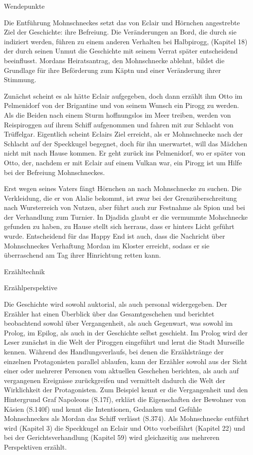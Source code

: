 Wendepunkte

Die Entführung Mohnschneckes setzt das von Eclair und Hörnchen angestrebte Ziel der Geschichte: ihre Befreiung.  Die Veränderungen an Bord, die durch sie indiziert werden, führen zu einem anderen Verhalten bei Halbpirogg, (Kapitel 18) der durch seinen Unmut die Geschichte mit seinem Verrat später entscheidend beeinflusst. Mordans Heiratsantrag, den Mohnschnecke ablehnt, bildet die Grundlage für ihre Beförderung zum Käptn und einer Veränderung ihrer Stimmung. 

Zunächst scheint es als hätte Eclair aufgegeben, doch dann erzählt ihm Otto im Pelmenidorf von der Brigantine und von seinem Wunsch ein Pirogg zu werden. Als die Beiden nach einem Sturm hoffnungslos im Meer treiben, werden von Reispiroggen auf ihrem Schiff aufgenommen und fahren mit zur Schlacht von Trüffelgar. Eigentlich scheint Eclairs Ziel erreicht, als er Mohnschnecke nach der Schlacht auf der Speckkugel begegnet, doch für ihn unerwartet, will das Mädchen nicht mit nach Hause kommen. Er geht zurück ins Pelmenidorf, wo er später von Otto, der, nachdem er mit Eclair auf einem Vulkan war, ein Pirogg ist um Hilfe bei der Befreiung Mohnschneckes.

Erst wegen seines Vaters fängt Hörnchen an nach Mohnschnecke zu suchen. Die Verkleidung, die er von Alalie bekommt, ist zwar bei der Grenzüberschreitung nach Wursterreich von Nutzen, aber führt auch zur Festnahme als Spion und bei der Verhandlung zum Turnier. In Djadida glaubt er die vermummte Mohschnecke gefunden zu haben, zu Hause stellt sich herraus, dass er hinters Licht geführt wurde. 
Entscheidend für das Happy End ist auch, dass die Nachricht über Mohnschneckes Verhaftung Mordan im Kloster erreicht, sodass er sie überraschend am Tag ihrer Hinrichtung retten kann.


Erzähltechnik
	
Erzählperspektive

Die Geschichte wird sowohl auktorial, als auch personal widergegeben. Der Erzähler hat einen Überblick über das Gesamtgeschehen und berichtet  beobachtend sowohl über Vergangenheit, als auch Gegenwart, was sowohl im Prolog, im Epilog, als auch in der Geschichte selbst geschieht. 
Im Prolog wird der Leser zunächst in die Welt der Piroggen eingeführt und lernt die Stadt Murseille kennen. Während des Handlungsverlaufs, bei denen die Erzählstränge der einzelnen Protagonisten parallel ablaufen, kann der Erzähler sowohl aus der Sicht einer oder mehrerer Personen vom aktuellen Geschehen berichten, als auch auf vergangenen Ereignisse zurückgreifen und vermittelt dadurch die Welt der Wirklichkeit der Protagonisten. Zum Beispiel kennt er die Vergangenheit und den Hintergrund Graf Napoleons (S.17f), erklärt die Eigenschaften der Bewohner von Käsien (S.140f) und kennt die Intentionen, Gedanken und Gefühle Mohnschneckes als Mordan das Schiff verlässt (S.374). Als Mohnschnecke entführt wird (Kapitel 3) die Speckkugel an Eclair und Otto vorbeifährt (Kapitel 22) und bei der Gerichtsverhandlung (Kapitel 59) wird gleichzeitig aus mehreren Perspektiven erzählt.




